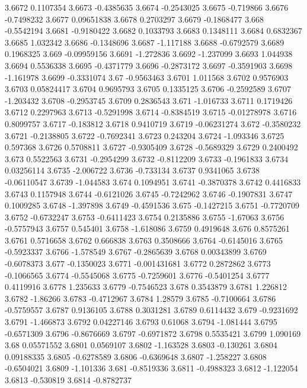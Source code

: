3.6672  0.1107354
3.6673  -0.4385635
3.6674  -0.2543025
3.6675  -0.719866
3.6676  -0.7498232
3.6677  0.09651838
3.6678  0.2703297
3.6679  -0.1868477
3.668  -0.5542194
3.6681  -0.9180422
3.6682  0.1033793
3.6683  0.1348111
3.6684  0.6832367
3.6685  1.032342
3.6686  -0.1348696
3.6687  -1.117188
3.6688  -0.6792579
3.6689  0.1968325
3.669  -0.09959156
3.6691  -1.272836
3.6692  -1.237099
3.6693  1.044938
3.6694  0.5536338
3.6695  -0.4371779
3.6696  -0.2873172
3.6697  -0.3591903
3.6698  -1.161978
3.6699  -0.3331074
3.67  -0.9563463
3.6701  1.011568
3.6702  0.9576903
3.6703  0.05824417
3.6704  0.9695793
3.6705  0.1335125
3.6706  -0.2592589
3.6707  -1.203432
3.6708  -0.2953745
3.6709  0.2836543
3.671  -1.016733
3.6711  0.1719426
3.6712  0.2297963
3.6713  -0.5291998
3.6714  -0.8384519
3.6715  -0.01278978
3.6716  0.8099757
3.6717  -0.183812
3.6718  0.9410719
3.6719  -0.06231274
3.672  -0.3580232
3.6721  -0.2138805
3.6722  -0.7692341
3.6723  0.243204
3.6724  -1.093346
3.6725  0.597368
3.6726  0.5708811
3.6727  -0.9305409
3.6728  -0.5689329
3.6729  0.2400492
3.673  0.5522563
3.6731  -0.2954299
3.6732  -0.8112209
3.6733  -0.1961833
3.6734  0.03256114
3.6735  -2.006722
3.6736  -0.733134
3.6737  0.9341065
3.6738  -0.06110547
3.6739  -1.044583
3.674  0.1094951
3.6741  -0.3870378
3.6742  0.4416833
3.6743  0.1157948
3.6744  -0.6121026
3.6745  -0.7242962
3.6746  -0.1907831
3.6747  0.1009285
3.6748  -1.397898
3.6749  -0.4591536
3.675  -0.1427215
3.6751  -0.7720709
3.6752  -0.6732247
3.6753  -0.6411423
3.6754  0.2135886
3.6755  -1.67063
3.6756  -0.5757943
3.6757  0.545401
3.6758  -1.618086
3.6759  0.4919648
3.676  0.8575261
3.6761  0.5716658
3.6762  0.666838
3.6763  0.3508666
3.6764  -0.6145016
3.6765  -0.5923337
3.6766  -1.578549
3.6767  -0.2865639
3.6768  0.00343899
3.6769  -0.6078373
3.677  -0.1350023
3.6771  -0.001431681
3.6772  0.2872862
3.6773  -0.1066565
3.6774  -0.5545068
3.6775  -0.7259601
3.6776  -0.5401254
3.6777  0.4119916
3.6778  1.235633
3.6779  -0.7546523
3.678  0.3543879
3.6781  1.226812
3.6782  -1.86266
3.6783  -0.4712967
3.6784  1.28579
3.6785  -0.7100664
3.6786  -0.5759557
3.6787  0.9136105
3.6788  0.3031281
3.6789  0.6114432
3.679  -0.9231692
3.6791  -1.466873
3.6792  0.04227146
3.6793  0.61068
3.6794  -1.081444
3.6795  -0.6571309
3.6796  -0.8676669
3.6797  -0.6971872
3.6798  0.5535421
3.6799  1.090169
3.68  0.05571552
3.6801  0.0569107
3.6802  -1.163528
3.6803  -0.130261
3.6804  0.09188335
3.6805  -0.6278589
3.6806  -0.6369648
3.6807  -1.258227
3.6808  -0.6504021
3.6809  -1.101336
3.681  -0.8519336
3.6811  -0.4988323
3.6812  -1.122054
3.6813  -0.530819
3.6814  -0.8782737
